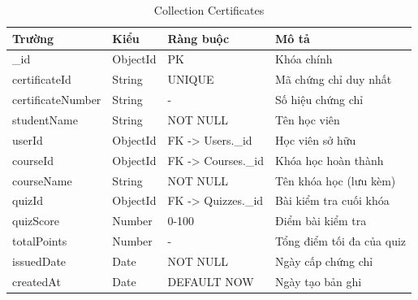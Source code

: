 \begin{table}[H]
\centering
\caption{Collection Certificates}
\begin{tabular}{|p{2.5cm}|p{2.5cm}|p{2.5cm}|p{5cm}|}
\hline
\textbf{Trường} & \textbf{Kiểu} & \textbf{Ràng buộc} & \textbf{Mô tả} \\ \hline
\_id & ObjectId & PK & Khóa chính \\ \hline
certificateId & String & UNIQUE & Mã chứng chỉ duy nhất \\ \hline
certificateNumber & String & - & Số hiệu chứng chỉ \\ \hline
studentName & String & NOT NULL & Tên học viên \\ \hline
userId & ObjectId & FK -> Users.\_id & Học viên sở hữu \\ \hline
courseId & ObjectId & FK -> Courses.\_id & Khóa học hoàn thành \\ \hline
courseName & String & NOT NULL & Tên khóa học (lưu kèm) \\ \hline
quizId & ObjectId & FK -> Quizzes.\_id & Bài kiểm tra cuối khóa \\ \hline
quizScore & Number & 0-100 & Điểm bài kiểm tra \\ \hline
totalPoints & Number & - & Tổng điểm tối đa của quiz \\ \hline
issuedDate & Date & NOT NULL & Ngày cấp chứng chỉ \\ \hline
createdAt & Date & DEFAULT NOW & Ngày tạo bản ghi \\ \hline
\end{tabular}
\end{table}

